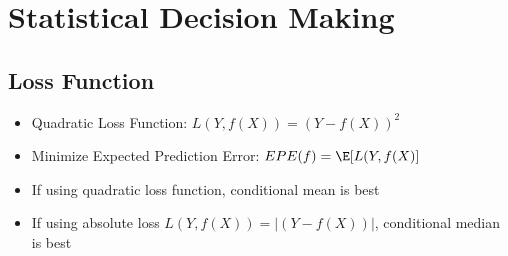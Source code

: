 \documentclass[english]{latex4ei/latex4ei_sheet}
\begin{document}
\section{Statistical Decision Making}
\begin{sectionbox}
\subsection{Loss Function}
\begin{itemize}
    \item Quadratic Loss Function: $L(Y, f(X))=(Y-f(X))^2$
    \item Minimize Expected Prediction Error: $EPE(f) = \E[L(Y,f(X)]$
    \item If using quadratic loss function, conditional mean is best
    \item If using absolute loss $L(Y, f(X))=\vert(Y-f(X))\vert$, conditional median is best
\end{itemize}


\end{sectionbox}
\end{document}
